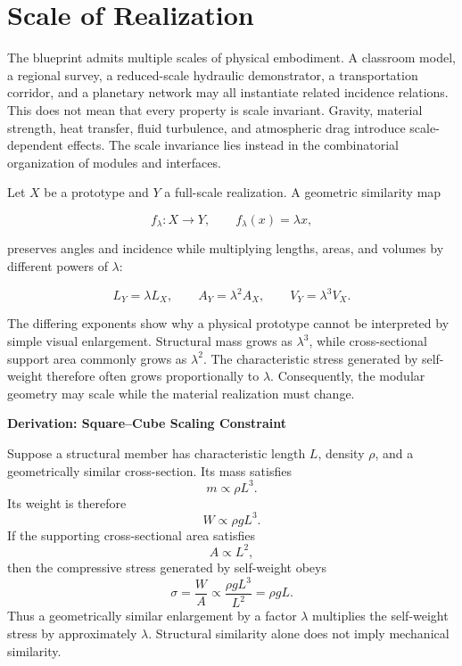 \documentclass[11pt,fleqn]{book}
\numberwithin{equation}{chapter}
\newenvironment{derivation}[1]
  {\begin{derivationEnv}
   \noindent\textbf{Derivation: #1}\par\smallskip}
  {\end{derivationEnv}}
\theoremstyle{plain}
\theoremstyle{definition}
\theoremstyle{remark}
\begin{document}
\section{Scale of Realization}

The blueprint admits multiple scales of physical embodiment. A classroom model, a regional survey, a reduced-scale hydraulic demonstrator, a transportation corridor, and a planetary network may all instantiate related incidence relations. This does not mean that every property is scale invariant. Gravity, material strength, heat transfer, fluid turbulence, and atmospheric drag introduce scale-dependent effects. The scale invariance lies instead in the combinatorial organization of modules and interfaces.

Let \(X\) be a prototype and \(Y\) a full-scale realization. A geometric similarity map

\begin{equation}
    f_\lambda : X \to Y,
    \qquad
    f_\lambda(x)=\lambda x,
\end{equation}

preserves angles and incidence while multiplying lengths, areas, and volumes by different powers of \(\lambda\):

\begin{equation}
    L_Y = \lambda L_X,
    \qquad
    A_Y = \lambda^2 A_X,
    \qquad
    V_Y = \lambda^3 V_X.
\end{equation}

The differing exponents show why a physical prototype cannot be interpreted by simple visual enlargement. Structural mass grows as \(\lambda^3\), while cross-sectional support area commonly grows as \(\lambda^2\). The characteristic stress generated by self-weight therefore often grows proportionally to \(\lambda\). Consequently, the modular geometry may scale while the material realization must change.

\begin{derivation}{Square--Cube Scaling Constraint}
Suppose a structural member has characteristic length \(L\), density \(\rho\), and a geometrically similar cross-section. Its mass satisfies
\[
m \propto \rho L^3.
\]
Its weight is therefore
\[
W \propto \rho gL^3.
\]
If the supporting cross-sectional area satisfies
\[
A \propto L^2,
\]
then the compressive stress generated by self-weight obeys
\[
\sigma = \frac{W}{A}
\propto
\frac{\rho gL^3}{L^2}
=
\rho gL.
\]
Thus a geometrically similar enlargement by a factor \(\lambda\) multiplies the self-weight stress by approximately \(\lambda\). Structural similarity alone does not imply mechanical similarity.
\end{derivation}
\end{document}
